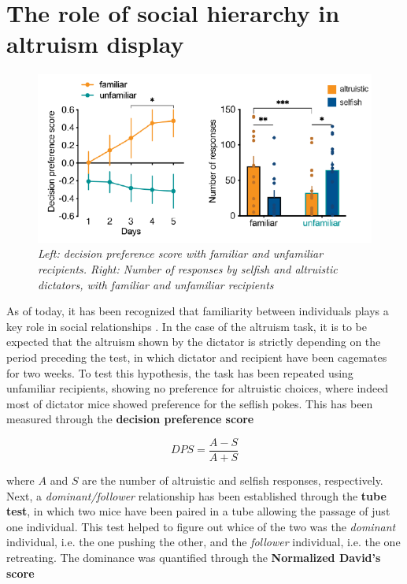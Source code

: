 \documentclass[12pt, a4paper]{report}
\begin{document}
\section{The role of social hierarchy in altruism display}

\begin{figure}[H]
	\begin{center}
		\includegraphics[scale=0.75]{familiar.png} 
	\end{center} 
	\caption{\textit{Left: decision preference score with familiar and unfamiliar recipients. Right: Number of responses by selfish and altruistic dictators, with familiar and unfamiliar recipients}} \label{familiar}
	
\end{figure}

As of today, it has been recognized that familiarity between individuals plays a key role in social relationships \cite{31}. %
 In the case of the altruism task, it is to be expected that the altruism shown by the dictator is strictly depending on the period preceding the test, in which dictator and recipient have been cagemates for two weeks. To test this hypothesis, the task has been repeated using unfamiliar recipients, showing no preference for altruistic choices, where indeed most of dictator mice showed preference for the seflish pokes. This has been measured through the \textbf{decision preference score} 

\begin{equation}
DPS = \frac{A -S}{A+S}
\end{equation}

where $A$ and $S$ are the number of altruistic and selfish responses, respectively.\\
Next, a \textit{dominant/follower} relationship has been established through the \textbf{tube test}, in which two mice have been paired in a tube allowing the passage of just one individual. This test helped to figure out whice of the two was the \textit{dominant} individual, i.e. the one pushing the other, and the \textit{follower} individual, i.e. the one retreating. The dominance was quantified through the \textbf{Normalized David's score} \cite{32} %
\end{document}

